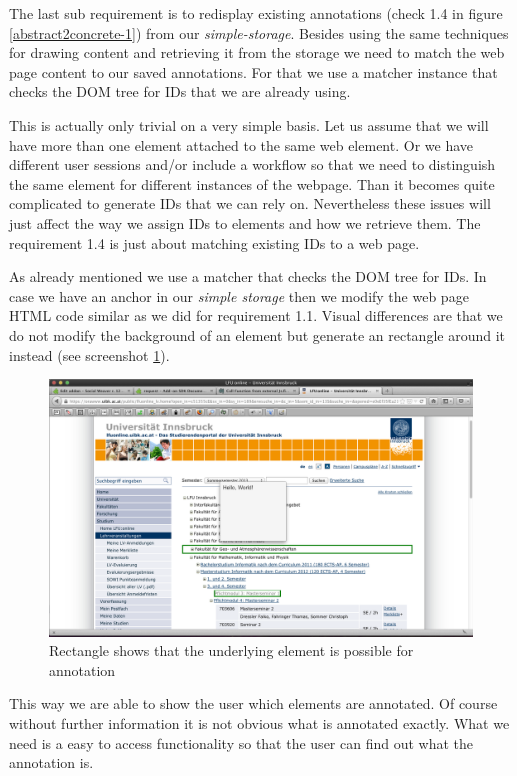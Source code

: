 The last sub requirement is to redisplay existing annotations (check 1.4 in figure \ref{abstract2concrete-1}) from our \emph{simple-storage}. Besides using the same techniques for drawing content and retrieving it from the storage we need to match the web page content to our saved annotations. For that we use a matcher instance that checks the DOM tree for IDs that we are already using. 

This is actually only trivial on a very simple basis. Let us assume that we will have more than one element attached to the same web element. Or we have different user sessions and/or include a workflow so that we need to distinguish the same element for different instances of the webpage. Than it becomes quite complicated to generate IDs that we can rely on. Nevertheless these issues will just affect the way we assign IDs to elements and how we retrieve them. The requirement 1.4 is just about matching existing IDs to a web page. 

As already mentioned we use a matcher that checks the DOM tree for IDs. In case we have an anchor in our \emph{simple storage} then we modify the web page HTML code similar as we did for requirement 1.1. Visual differences are that we do not modify the background of an element but generate an rectangle around it instead (see screenshot \ref{annotation-rectangle-sample2}). 

\begin{figure} \centering
		\includegraphics[width=12cm]{images/annotation-rectangle-sample2.png}
		\caption{Rectangle shows that the underlying element is possible for annotation}
		\label{annotation-rectangle-sample2}
\end{figure} 

This way we are able to show the user which elements are annotated. Of course without further information it is not obvious what is annotated exactly. What we need is a easy to access functionality so that the user can find out what the annotation is. 

